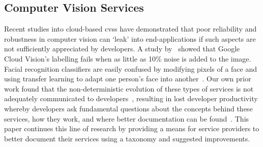 \subsection{Computer Vision Services}

Recent studies into cloud-based \glspl{cvs} have demonstrated that poor reliability and robustness in computer vision can `leak' into end-applications if such aspects are not sufficiently appreciated by developers. A study by~\citet{Hosseini:2018jr} showed that Google Cloud Vision's labelling fails when as little as 10\% noise is added to the image. Facial recognition classifiers are easily confused by modifying pixels of a face and using transfer learning to adapt one person's face into another~\citep{Wang:2018vl}. Our own prior work found that the non-deterministic evolution of these types of services is not adequately communicated to developers~\citep{Cummaudo:2019icsme}, resulting in lost developer productivity whereby developers ask fundamental questions about the concepts behind these services, how they work, and where better documentation can be found~\citep{Cummaudo:2020icse}. This paper continues this line of research by providing a means for service providers to better document their services using a taxonomy and suggested improvements.

%



